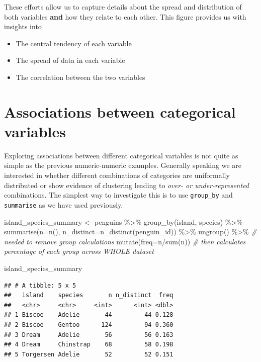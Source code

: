 \documentclass[
]{book}
\newenvironment{Shaded}{\begin{snugshade}}{\end{snugshade}}
\newcommand{\AttributeTok}[1]{\textcolor[rgb]{0.77,0.63,0.00}{#1}}
\newcommand{\CommentTok}[1]{\textcolor[rgb]{0.56,0.35,0.01}{\textit{#1}}}
\newcommand{\FunctionTok}[1]{\textcolor[rgb]{0.00,0.00,0.00}{#1}}
\newcommand{\NormalTok}[1]{#1}
\newcommand{\OtherTok}[1]{\textcolor[rgb]{0.56,0.35,0.01}{#1}}
\newcommand{\SpecialCharTok}[1]{\textcolor[rgb]{0.00,0.00,0.00}{#1}}
\begin{document}
These efforts allow us to capture details about the spread and distribution of both variables \textbf{and} how they relate to each other. This figure provides us with insights into

\begin{itemize}
\item
  The central tendency of each variable
\item
  The spread of data in each variable
\item
  The correlation between the two variables
\end{itemize}

\hypertarget{associations-between-categorical-variables}{%
\section{Associations between categorical variables}\label{associations-between-categorical-variables}}

Exploring associations between different categorical variables is not quite as simple as the previous numeric-numeric examples. Generally speaking we are interested in whether different combinations of categories are uniformally distributed or show evidence of clustering leading to \emph{over- or under-represented} combinations.
The simplest way to investigate this is to use \texttt{group\_by} and \texttt{summarise} as we have used previously.

\begin{Shaded}
\begin{Highlighting}[]
\NormalTok{island\_species\_summary }\OtherTok{\textless{}{-}}\NormalTok{ penguins }\SpecialCharTok{\%\textgreater{}\%} 
  \FunctionTok{group\_by}\NormalTok{(island, species) }\SpecialCharTok{\%\textgreater{}\%} 
  \FunctionTok{summarise}\NormalTok{(}\AttributeTok{n=}\FunctionTok{n}\NormalTok{(),}
            \AttributeTok{n\_distinct=}\FunctionTok{n\_distinct}\NormalTok{(penguin\_id)) }\SpecialCharTok{\%\textgreater{}\%} 
  \FunctionTok{ungroup}\NormalTok{() }\SpecialCharTok{\%\textgreater{}\%} \CommentTok{\# needed to remove group calculations}
  \FunctionTok{mutate}\NormalTok{(}\AttributeTok{freq=}\NormalTok{n}\SpecialCharTok{/}\FunctionTok{sum}\NormalTok{(n)) }\CommentTok{\# then calculates percentage of each group across WHOLE dataset}

\NormalTok{island\_species\_summary}
\end{Highlighting}
\end{Shaded}

\begin{verbatim}
## # A tibble: 5 x 5
##   island    species       n n_distinct  freq
##   <chr>     <chr>     <int>      <int> <dbl>
## 1 Biscoe    Adelie       44         44 0.128
## 2 Biscoe    Gentoo      124         94 0.360
## 3 Dream     Adelie       56         56 0.163
## 4 Dream     Chinstrap    68         58 0.198
## 5 Torgersen Adelie       52         52 0.151
\end{verbatim}
\end{document}
